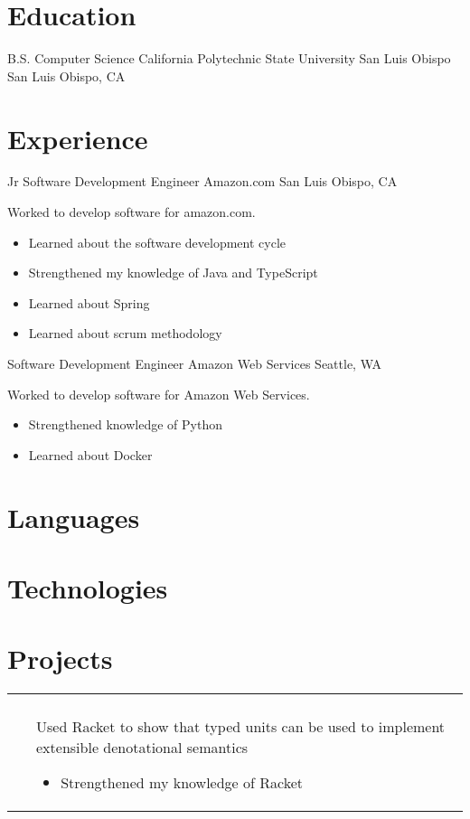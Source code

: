 \documentclass[11pt,a4paper,sans]{moderncv}        %
\makeatletter
\newcommand{\project}[3]{
    \begin{tabular}{p{\hintscolumnwidth}@{\hspace{\separatorcolumnwidth}}p{\maincolumnwidth}@{}}
        \raggedleft\hintstyle{#1} & #2\\
                            ~     & #3
    \end{tabular}
}
\makeatother
\begin{document}
\makecvtitle

\section{Education}
    {B.S. Computer Science}
    {California Polytechnic State University San Luis Obispo}
    {San Luis Obispo, CA}
    {}
    {}

\section{Experience}
    {Jr Software Development Engineer}
    {Amazon.com}
    {San Luis Obispo, CA}
    {}
    {
        Worked to develop software for amazon.com.
        \begin{itemize}
            \item Learned about the software development cycle
            \item Strengthened my knowledge of Java and TypeScript
            \item Learned about Spring
            \item Learned about scrum methodology
        \end{itemize}
    }
    {Software Development Engineer}
    {Amazon Web Services}
    {Seattle, WA}
    {}
    {
        Worked to develop software for Amazon Web Services.
        \begin{itemize}
            \item Strengthened knowledge of Python
            \item Learned about Docker
        \end{itemize}
    }

\section{Languages}

\section{Technologies}

\section{Projects}
\project{Senior Project}
    {\httplink{https://github.com/thewells1024/SeniorProject}}
    {
        \raggedright{Used Racket to show that typed units can be used to implement extensible denotational semantics}
        \begin{itemize}
            \item Strengthened my knowledge of Racket
        \end{itemize}
    }
\end{document}
